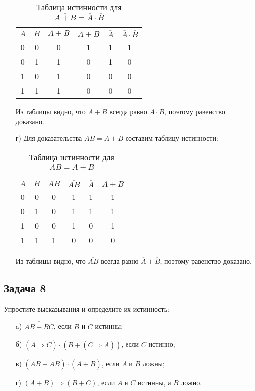 \documentclass[a4paper,12pt]{article}
\begin{document}
\begin{itemize}
\begin{table}[h!]
\centering
\begin{tabular}{|c|c|c|c|c|c|}
\hline
\(A\) & \(B\) & \(A + B\) & \(\overline{A + B}\) & \(\overline{A}\) & \(\overline{A} \cdot \overline{B}\) \\ \hline
0 & 0 & 0 & 1 & 1 & 1 \\ \hline
0 & 1 & 1 & 0 & 1 & 0 \\ \hline
1 & 0 & 1 & 0 & 0 & 0 \\ \hline
1 & 1 & 1 & 0 & 0 & 0 \\ \hline
\end{tabular}
\caption{Таблица истинности для \(\overline{A + B} = \overline{A} \cdot \overline{B}\)}
\end{table}

Из таблицы видно, что \(\overline{A + B}\) всегда равно \(\overline{A} \cdot \overline{B}\), поэтому равенство доказано.

\item[г)] Для доказательства \(\overline{AB} = \overline{A} + \overline{B}\) составим таблицу истинности:

\begin{table}[h!]
\centering
\begin{tabular}{|c|c|c|c|c|c|}
\hline
\(A\) & \(B\) & \(AB\) & \(\overline{AB}\) & \(\overline{A}\) & \(\overline{A} + \overline{B}\) \\ \hline
0 & 0 & 0 & 1 & 1 & 1 \\ \hline
0 & 1 & 0 & 1 & 1 & 1 \\ \hline
1 & 0 & 0 & 1 & 0 & 1 \\ \hline
1 & 1 & 1 & 0 & 0 & 0 \\ \hline
\end{tabular}
\caption{Таблица истинности для \(\overline{AB} = \overline{A} + \overline{B}\)}
\end{table}

Из таблицы видно, что \(\overline{AB}\) всегда равно \(\overline{A} + \overline{B}\), поэтому равенство доказано.
\end{itemize}

\vspace{1cm}



\subsection{Задача 8}
Упростите высказывания и определите их истинность:
\begin{itemize}
    \item[a)] \(\overline{\overline{AB} + BC}\), если \(B\) и \(C\) истинны;
    \item[б)] \(\overline{(\overline{A \Rightarrow C})} \cdot (B + (\overline{C} \Rightarrow A))\), если \(C\) истинно;
    \item[в)] \(\overline{(AB + \overline{AB})} \cdot (A + \overline{B})\), если \(A\) и \(B\) ложны;
    \item[г)] \(\overline{(A + B) \Rightarrow \overline{(B + C)}}\), если \(A\) и \(C\) истинны, а \(B\) ложно.
\end{itemize}
\end{document}
